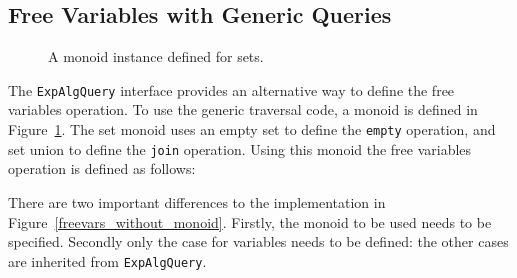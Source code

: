 \begin{comment}
And now we find everything goes in an easier way: we don't care about
what kind of query it is any more during the traversal. Despite
whether it asks for all the names of free variables or a printer
showing the hierarchy of an expression, at first we can simply
override the method \lstinline{m()}, which provides an instance of
\lstinline{Monoid}, in the return statement. As the next step, we only
need to override a few other methods to meet the requirements. This is
the progress, once we have such a template dealing with the traversal,
all query algebras can be addressed in a more concise way, which is
called the \textit{generic query algebra}.
\end{comment}

\subsection{Free Variables with Generic Queries}\label{subsec:solvingfreevars}

\begin{figure}[t]
\vspace{-.1in}
\caption{A monoid instance defined for sets.}
\label{freevars_monoid}
\end{figure}

The \lstinline{ExpAlgQuery} interface provides an alternative way to
define the free variables operation. To use the generic traversal
code, a monoid is defined in Figure~\ref{freevars_monoid}. The set monoid
uses an empty set to define the \lstinline{empty} operation, and set
union to define the \lstinline{join} operation. Using this monoid
the free variables operation is defined as follows:



There are two important differences to the implementation in
Figure~\ref{freevars_without_monoid}.  Firstly, the monoid to be used
needs to be specified.  Secondly only the case for variables needs to
be defined: the other cases are inherited from
\lstinline{ExpAlgQuery}.

